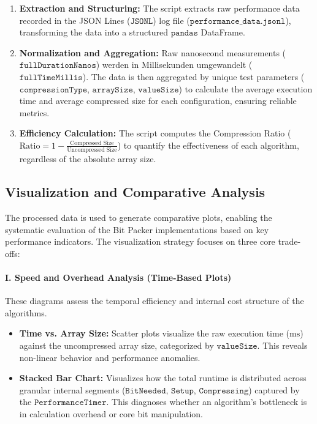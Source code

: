 \documentclass[11pt, a4paper]{article}
\begin{document}
	\begin{enumerate}
		\item \textbf{Extraction and Structuring:} The script extracts raw performance data recorded in the JSON Lines ($\texttt{JSONL}$) log file ($\texttt{performance\_data.jsonl}$), transforming the data into a structured $\texttt{pandas}$ DataFrame.
		
		\item \textbf{Normalization and Aggregation:} Raw nanosecond measurements ($\texttt{fullDurationNanos}$) werden in Millisekunden umgewandelt ($\texttt{fullTimeMillis}$). The data is then aggregated by unique test parameters ($\texttt{compressionType}$, $\texttt{arraySize}$, $\texttt{valueSize}$) to calculate the average execution time and average compressed size for each configuration, ensuring reliable metrics.
		
		\item \textbf{Efficiency Calculation:} The script computes the Compression Ratio ($\text{Ratio} = 1 - \frac{\text{Compressed Size}}{\text{Uncompressed Size}}$) to quantify the effectiveness of each algorithm, regardless of the absolute array size.
	\end{enumerate}
	
	\subsection{Visualization and Comparative Analysis}
	\label{sec:visualization_comparison}
	
	The processed data is used to generate comparative plots, enabling the systematic evaluation of the Bit Packer implementations based on key performance indicators. The visualization strategy focuses on three core trade-offs:
	
	\paragraph{I. Speed and Overhead Analysis (Time-Based Plots)}
	These diagrams assess the temporal efficiency and internal cost structure of the algorithms.
	
	\begin{itemize}
		\item \textbf{Time vs. Array Size:} Scatter plots visualize the raw execution time ($\text{ms}$) against the uncompressed array size, categorized by $\texttt{valueSize}$. This reveals non-linear behavior and performance anomalies.
		
		\item \textbf{Stacked Bar Chart:} Visualizes how the total runtime is distributed across granular internal segments ($\texttt{BitNeeded}$, $\texttt{Setup}$, $\texttt{Compressing}$) captured by the $\texttt{PerformanceTimer}$. This diagnoses whether an algorithm's bottleneck is in calculation overhead or core bit manipulation.
	\end{itemize}
	
\end{document}
